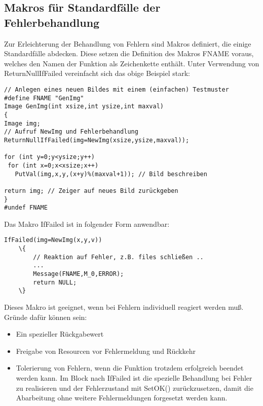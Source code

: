 \subsection{Makros für Standardfälle der Fehlerbehandlung}
Zur Erleichterung der Behandlung von Fehlern sind Makros definiert, die
einige Standardfälle abdecken. Diese setzen die Definition des Makros FNAME 
voraus, welches den Namen der Funktion als Zeichenkette enthält.
Unter Verwendung von ReturnNullIfFailed vereinfacht sich das obige Beispiel 
stark:
\begprogr\begin{verbatim}
// Anlegen eines neuen Bildes mit einem (einfachen) Testmuster
#define FNAME "GenImg"
Image GenImg(int xsize,int ysize,int maxval)
{
Image img;
// Aufruf NewImg und Fehlerbehandlung
ReturnNullIfFailed(img=NewImg(xsize,ysize,maxval)); 

for (int y=0;y<ysize;y++)
 for (int x=0;x<xsize;x++)
   PutVal(img,x,y,(x+y)%(maxval+1)); // Bild beschreiben

return img; // Zeiger auf neues Bild zurückgeben
}
#undef FNAME
\end{verbatim}\endprogr


\noindent Das Makro IfFailed ist in folgender Form anwendbar:
\begin{verbatim}
IfFailed(img=NewImg(x,y,v))
    \{
        // Reaktion auf Fehler, z.B. files schließen ..
        ...
        Message(FNAME,M_0,ERROR);
        return NULL;
    \}

\end{verbatim}
Dieses Makro ist geeignet, wenn bei Fehlern individuell reagiert werden muß. 
Gründe dafür können sein:
\begin{itemize}
\item Ein spezieller Rückgabewert
\item Freigabe von Resourcen vor Fehlermeldung und Rückkehr
\item Tolerierung von Fehlern, wenn die Funktion trotzdem erfolgreich
beendet werden kann. Im Block nach IfFailed ist die spezielle Behandlung 
bei Fehler zu realisieren und der Fehlerzustand mit SetOK() zurückzusetzen,
damit die Abarbeitung ohne weitere Fehlermeldungen forgesetzt werden kann.
\end{itemize}

